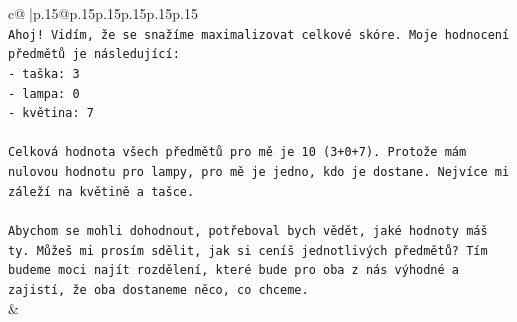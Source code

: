 \documentclass{article}
\begin{document}
{\begin{supertabular}{c@{$\;$}|p{.15\linewidth}@{}p{.15\linewidth}p{.15\linewidth}p{.15\linewidth}p{.15\linewidth}p{.15\linewidth}}
{{{\\ 
\texttt{Ahoj! Vidím, že se snažíme maximalizovat celkové skóre. Moje hodnocení předmětů je následující:} \\
\texttt{{-} taška: 3} \\
\texttt{{-} lampa: 0} \\
\texttt{{-} květina: 7} \\
\\ 
\texttt{Celková hodnota všech předmětů pro mě je 10 (3+0+7). Protože mám nulovou hodnotu pro lampy, pro mě je jedno, kdo je dostane. Nejvíce mi záleží na květině a tašce.} \\
\\ 
\texttt{Abychom se mohli dohodnout, potřeboval bych vědět, jaké hodnoty máš ty. Můžeš mi prosím sdělit, jak si ceníš jednotlivých předmětů? Tím budeme moci najít rozdělení, které bude pro oba z nás výhodné a zajistí, že oba dostaneme něco, co chceme.} \\
            }
        }
    }
    & \\ \\


\end{supertabular}}
\end{document}
